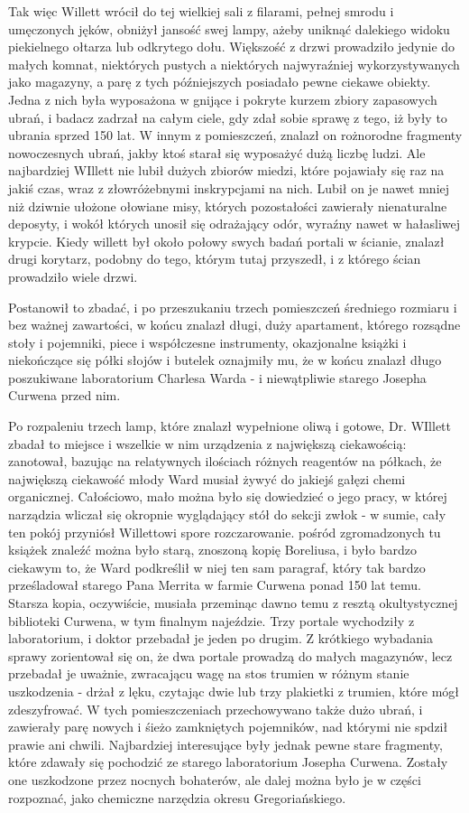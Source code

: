 Tak więc Willett wrócił do tej wielkiej sali z filarami, pełnej smrodu i umęczonych jęków, obniżył jansość swej lampy, ażeby uniknąć dalekiego widoku piekielnego ołtarza lub odkrytego dołu. Większość z drzwi prowadziło jedynie do małych komnat, niektórych pustych a niektórych najwyraźniej wykorzystywanych jako magazyny, a parę z tych późniejszych posiadało pewne ciekawe obiekty. Jedna z nich była wyposażona w gnijące i pokryte kurzem zbiory zapasowych ubrań, i badacz zadrzał na całym ciele, gdy zdał sobie sprawę z tego, iż były to ubrania sprzed 150 lat. W innym z pomieszczeń, znalazł on rożnorodne fragmenty nowoczesnych ubrań, jakby ktoś starał się wyposażyć dużą liczbę ludzi. Ale najbardziej WIllett nie lubił dużych zbiorów miedzi, które pojawiały się raz na jakiś czas, wraz z złowróżebnymi inskrypcjami na nich. Lubił on je nawet mniej niż dziwnie ułożone ołowiane misy, których pozostałości zawierały nienaturalne deposyty, i wokół których unosił się odrażający odór, wyraźny nawet w hałasliwej krypcie. Kiedy willett był około połowy swych badań portali w ścianie, znalazł drugi korytarz, podobny do tego, którym tutaj przyszedł, i z którego ścian prowadziło wiele drzwi. 

Postanowił to zbadać, i po przeszukaniu trzech pomieszczeń średniego rozmiaru i bez ważnej zawartości, w końcu znalazł długi, duży apartament, którego rozsądne stoły i pojemniki, piece i współczesne instrumenty, okazjonalne książki i niekończące się półki słojów i butelek oznajmiły mu, że w końcu znalazł długo poszukiwane laboratorium Charlesa Warda - i niewątpliwie starego Josepha Curwena przed nim.

Po rozpaleniu trzech lamp, które znalazł wypełnione oliwą i gotowe, Dr. WIllett zbadał to miejsce i wszelkie w nim urządzenia z największą ciekawością: zanotował, bazując na relatywnych ilościach różnych reagentów na półkach, że największą ciekawość młody Ward musiał żywyć do jakiejś gałęzi chemi organicznej. Całościowo, mało można było się dowiedzieć o jego pracy, w której narządzia wliczał się okropnie wyglądający stół do sekcji zwłok - w sumie, cały ten pokój przyniósł Willettowi spore rozczarowanie. pośród zgromadzonych tu książek znaleźć można było starą, znoszoną kopię Boreliusa, i było bardzo ciekawym to, że Ward podkreślił w niej ten sam paragraf, który tak bardzo prześladował starego Pana Merrita w farmie Curwena ponad 150 lat temu. Starsza kopia, oczywiście, musiała przeminąc dawno temu z resztą okultystycznej biblioteki Curwena, w tym finalnym najeździe. Trzy portale wychodziły z laboratorium, i doktor przebadał je jeden po drugim. Z krótkiego wybadania sprawy zorientował się on, że dwa portale prowadzą do małych magazynów, lecz przebadał je uważnie, zwracającu wagę na stos trumien w różnym stanie uszkodzenia - drżał z lęku, czytając dwie lub trzy plakietki z trumien, które mógł zdeszyfrować. W tych pomieszczeniach przechowywano także dużo ubrań, i zawierały parę nowych i śieżo zamkniętych pojemników, nad którymi nie spdził prawie ani chwili. Najbardziej interesujące były jednak pewne stare fragmenty, które zdawały się pochodzić ze starego laboratorium Josepha Curwena. Zostały one uszkodzone przez nocnych bohaterów, ale dalej można było je w części rozpoznać, jako chemiczne narzędzia okresu Gregoriańskiego.  

